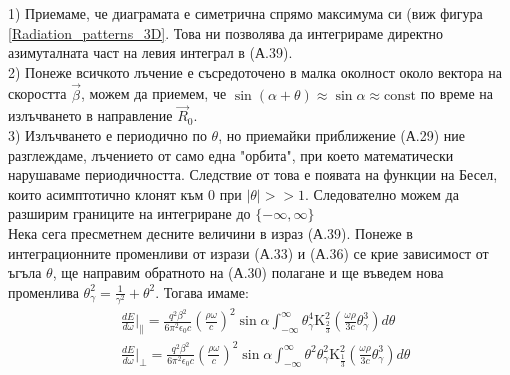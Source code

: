 \begin{appendices}
1) Приемаме, че диаграмата е симетрична спрямо максимума си (виж фигура \ref{Radiation_patterns_3D}. Това ни позволява да интегрираме директно азимуталната част на левия интеграл в (А.39).\\

2) Понеже всичкото лъчение е съсредоточено в малка околност около вектора на скоростта $\vec{\beta}$, можем да приемем, че $\sin(\alpha + \theta)\approx \sin\alpha\approx\text{const}$ по време на излъчването в направление $\vec{R}_0$.  \\

3) Излъчването е периодично по $\theta$, но приемайки приближение (А.29) ние разглеждаме, лъчението от само една "орбита", при което математически нарушаваме периодичността. Следствие от това е появата на функции на Бесел, които асимптотично клонят към 0 при $|\theta| >> 1$. Следователно можем да разширим границите на интегриране до $\{-\infty, \infty\}$\\

Нека сега пресметнем десните величини в израз (А.39). Понеже в интеграционните променливи от изрази (А.33) и (А.36) се крие зависимост от ъгъла $\theta$, ще направим обратното на (А.30) полагане и ще въведем нова променлива $\theta^2_\gamma = \frac{1}{\gamma^2} + \theta^2$. Тогава имаме:
\begin{equation}
	\begin{split}
		&\frac{dE}{d\omega}\bigg\vert_\parallel = \frac{q^2\beta^2}{6\pi^2\epsilon_0 c}\left(\frac{\rho\omega}{c}\right)^2\sin\alpha \int_{-\infty}^\infty \theta_\gamma^4 \text{K}^2_{\frac{2}{3}}\left(\frac{\omega\rho}{3 c}\theta_\gamma^3\right)d\theta\\
		&\frac{dE}{d\omega}\bigg\vert_\perp = \frac{q^2\beta^2}{6\pi^2\epsilon_0 c}\left(\frac{\rho\omega}{c}\right)^2\sin\alpha \int_{-\infty}^\infty \theta^2\theta_\gamma^2 \text{K}^2_{\frac{1}{3}}\left(\frac{\omega\rho}{3 c}\theta_\gamma^3\right)d\theta
	\end{split}
\end{equation}

\end{appendices}

